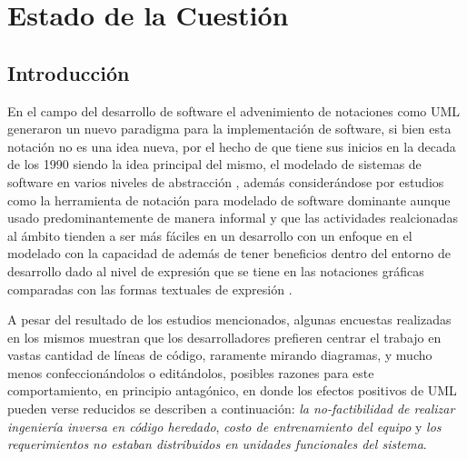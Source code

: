\chapter{Estado de la Cuestión}%
\label{sec:estadodelacuestion}

\section{Introducción}
\label{sec:introduccion}
En el campo del desarrollo de software el advenimiento de notaciones como UML
generaron un nuevo paradigma para la implementación de software, si bien esta
notación no es una idea nueva, por el hecho de que tiene sus inicios en la decada de los
1990 siendo la idea principal del mismo, el modelado de sistemas de software en
varios niveles de abstracción  \cite{chaudron2017}, además considerándose por
estudios como la herramienta de notación para modelado de software dominante
\cite{aldaeej2016} aunque usado predominantemente de manera informal y que las
actividades realcionadas al ámbito tienden a ser
más fáciles en un desarrollo con un enfoque en el modelado \cite{forward2010}
con la capacidad de además de tener beneficios dentro del entorno de desarrollo
dado al nivel de expresión que se tiene en las
notaciones gráficas comparadas con las formas textuales de expresión
\cite{rumpe2004}.

A pesar del resultado de los estudios mencionados, algunas encuestas realizadas
en los mismos muestran que los desarrolladores prefieren centrar el trabajo en vastas
cantidad de líneas de código, raramente mirando diagramas, y mucho menos
confeccionándolos o editándolos, posibles razones para este
comportamiento, en principio antagónico, en donde los efectos positivos de UML pueden
verse reducidos \cite{bente2006} se describen a continuación:
\textit{la no-factibilidad de realizar ingeniería inversa en código heredado},
\textit{costo de entrenamiento del equipo} y \textit{los requerimientos no
estaban distribuidos en unidades funcionales del sistema}.

